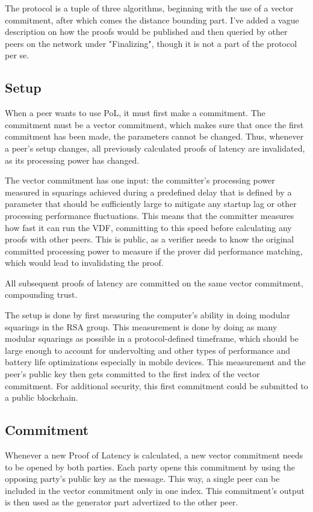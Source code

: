 The protocol is a tuple of three algorithms, beginning with the use of a vector commitment, after which comes the distance bounding part. I've added a vague description on how the proofs would be published and then queried by other peers on the network under "Finalizing", though it is not a part of the protocol per se.

\subsection{Setup}
When a peer wants to use PoL, it must first make a commitment. The commitment must be a vector commitment, which makes sure that once the first commitment has been made, the parameters cannot be changed. Thus, whenever a peer's setup changes, all previously calculated proofs of latency are invalidated, as its processing power has changed.

The vector commitment has one input: the committer's processing power measured in squarings achieved during a predefined delay that is defined by a parameter that should be sufficiently large to mitigate any startup lag or other processing performance fluctuations. This means that the committer measures how fast it can run the VDF, committing to this speed before calculating any proofs with other peers. This is public, as a verifier needs to know the original committed processing power to measure if the prover did performance matching, which would lead to invalidating the proof.

All subsequent proofs of latency are committed on the same vector commitment, compounding trust.

The setup is done by first measuring the computer's ability in doing modular squarings in the RSA group. This measurement is done by doing as many modular squarings as possible in a protocol-defined timeframe, which should be large enough to account for undervolting and other types of performance and battery life optimizations especially in mobile devices. This measurement and the peer's public key then gets committed to the first index of the vector commitment. For additional security, this first commitment could be submitted to a public blockchain.

\subsection{Commitment}
Whenever a new Proof of Latency is calculated, a new vector commitment needs to be opened by both parties. Each party opens this commitment by using the opposing party's public key as the message. This way, a single peer can be included in the vector commitment only in one index. This commitment's output is then used as the generator part advertized to the other peer.


